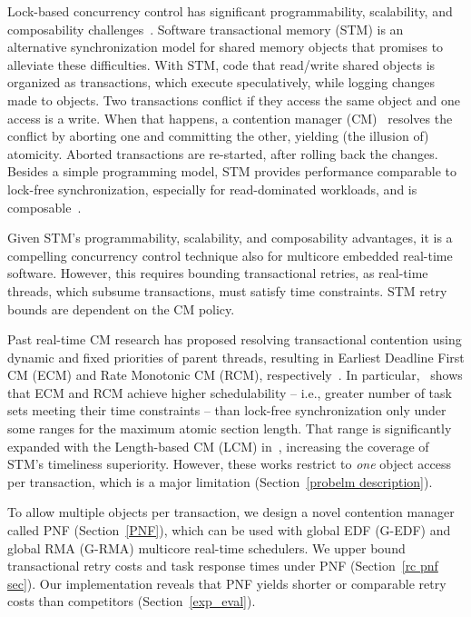 \documentclass[twocolumn]{article}
\begin{document}
Lock-based concurrency control has significant programmability, scalability, and composability challenges~\cite{Herlihy:2006:AMP:1146381.1146382}. Software transactional memory (STM) is an alternative synchronization model for shared memory objects that promises to alleviate these difficulties. With STM, code that read/write shared objects is organized as transactions, which execute speculatively, while logging changes made to objects. Two transactions conflict if they access the same object and one access is a write. When that happens, a contention manager (CM)~\cite{Guerraoui:2005:TTT:1073814.1073863} resolves the conflict by aborting one and committing the other, yielding (the illusion of) atomicity. Aborted transactions are re-started, after rolling back the changes. Besides a simple programming model, STM provides performance comparable to lock-free synchronization, especially for read-dominated workloads, and is composable~\cite{Harris:2005:CMT:1065944.1065952}.  

Given STM's programmability, scalability, and composability advantages, it is a compelling concurrency control technique also for multicore embedded real-time software. However, this requires  bounding transactional  retries, as real-time threads, which subsume transactions, must satisfy time constraints.  STM retry bounds are dependent on the CM policy.

Past real-time CM research has proposed resolving transactional contention using dynamic and fixed priorities of parent threads, resulting in Earliest Deadline First CM (ECM) and Rate Monotonic CM (RCM), respectively~\cite{6045438,stmconcurrencycontrol:emsoft11,lcmdac2012}.
In particular,~\cite{stmconcurrencycontrol:emsoft11} shows that ECM and RCM achieve higher schedulability -- i.e., greater number of task sets meeting their time constraints -- than lock-free synchronization only under some ranges for the maximum atomic section length. That range is significantly expanded with the Length-based CM (LCM) in~\cite{lcmdac2012}, increasing the coverage of STM's timeliness superiority. However, these works restrict to \textit{one} object access per transaction, which is a major limitation (Section~\ref{probelm description}). 

To allow multiple objects per transaction, we design a novel contention manager called PNF  (Section~\ref{PNF}), which can be used with global EDF (G-EDF) and global RMA (G-RMA) multicore real-time schedulers. 
We upper bound transactional retry costs and task response times under PNF (Section~\ref{rc pnf sec}).
 Our implementation reveals that PNF yields shorter or comparable retry costs than competitors (Section~\ref{exp_eval}).
\end{document}
